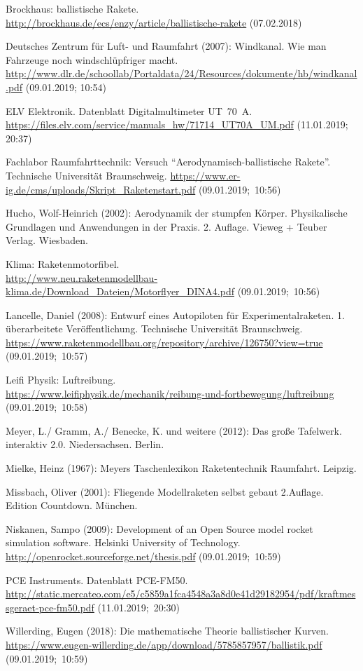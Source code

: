 \documentclass[10pt,a4paper]{article}
\begin{document}
\newpage
\begin{thebibliography}{99}
	Brockhaus: ballistische Rakete. \\
	\url{http://brockhaus.de/ecs/enzy/article/ballistische-rakete} (07.02.2018)
	
	Deutsches Zentrum für Luft- und Raumfahrt (2007): Windkanal. Wie man Fahrzeuge noch windschlüpfriger macht.\\
	\url{http://www.dlr.de/schoollab/Portaldata/24/Resources/dokumente/hb/windkanal.pdf} (09.01.2019; 10:54)
	
	ELV Elektronik. Datenblatt Digitalmultimeter UT~70~A.
	\url{https://files.elv.com/service/manuals_hw/71714_UT70A_UM.pdf} (11.01.2019; 20:37)
	
	Fachlabor Raumfahrttechnik: Versuch "`Aerodynamisch-ballistische Rakete"'. Technische Universität Braunschweig.
	\url{https://www.er-ig.de/cms/uploads/Skript_Raketenstart.pdf} (09.01.2019;~10:56)
	
	Hucho, Wolf-Heinrich (2002): Aerodynamik der stumpfen Körper. Physikalische Grundlagen und Anwendungen in der Praxis. 2. Auflage. Vieweg + Teuber Verlag. Wiesbaden.
	
	Klima: Raketenmotorfibel. \\
	\url{http://www.neu.raketenmodellbau-klima.de/Download_Dateien/Motorflyer_DINA4.pdf} (09.01.2019;~10:56)
	
	Lancelle, Daniel (2008): Entwurf eines Autopiloten für Experimentalraketen. 1. überarbeitete Veröffentlichung.
	Technische Universität Braunschweig.
	\url{https://www.raketenmodellbau.org/repository/archive/126750?view=true} (09.01.2019;~10:57)
	
	Leifi Physik: Luftreibung.\\ \url{https://www.leifiphysik.de/mechanik/reibung-und-fortbewegung/luftreibung} (09.01.2019;~10:58)
	
	Meyer, L./ Gramm, A./ Benecke, K. und weitere (2012): Das große Tafelwerk. interaktiv 2.0. Niedersachsen. Berlin. 
	
	Mielke, Heinz (1967): Meyers Taschenlexikon Raketentechnik Raumfahrt. Leipzig. 
	
	Missbach, Oliver (2001): Fliegende Modellraketen selbst gebaut 2.Auflage. Edition Countdown. München. 
	
	Niskanen, Sampo (2009): Development of an Open Source model rocket simulation software. Helsinki University of Technology. \url{http://openrocket.sourceforge.net/thesis.pdf} (09.01.2019;~10:59)
	
	PCE Instruments. Datenblatt PCE-FM50. \\
	\url{http://static.mercateo.com/e5/c5859a1fca4548a3a8d0e41d29182954/pdf/kraftmessgeraet-pce-fm50.pdf} (11.01.2019;~20:30)
	
	Willerding, Eugen (2018): Die mathematische Theorie ballistischer Kurven.\\ \url{https://www.eugen-willerding.de/app/download/5785857957/ballistik.pdf} (09.01.2019;~10:59)
\end{thebibliography}
\end{document}
